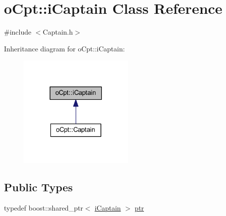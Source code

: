 \hypertarget{classo_cpt_1_1i_captain}{}\section{o\+Cpt\+:\+:i\+Captain Class Reference}
\label{classo_cpt_1_1i_captain}


{\ttfamily \#include $<$Captain.\+h$>$}



Inheritance diagram for o\+Cpt\+:\+:i\+Captain\+:\nopagebreak
\begin{figure}[H]
\begin{center}
\leavevmode
\includegraphics[width=158pt]{classo_cpt_1_1i_captain__inherit__graph}
\end{center}
\end{figure}
\subsection*{Public Types}
\begin{DoxyCompactItemize}
\item 
typedef boost\+::shared\+\_\+ptr$<$ \hyperlink{classo_cpt_1_1i_captain}{i\+Captain} $>$ \hyperlink{classo_cpt_1_1i_captain_ae1595d808fa14777c26f1227a82ac4f5}{ptr}
\end{DoxyCompactItemize}
